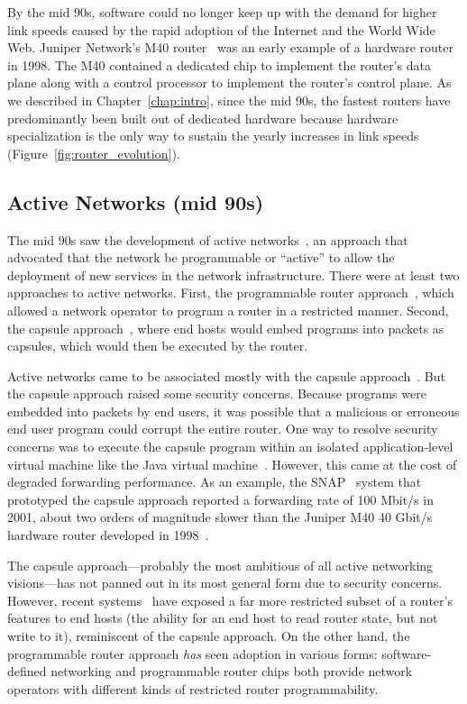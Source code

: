 By the mid 90s, software could no longer keep up with the demand for higher
link speeds caused by the rapid adoption of the Internet and the World Wide
Web. Juniper Network's M40 router~\cite{m40} was an early example of a hardware
router in 1998.  The M40 contained a dedicated chip to implement the router's
data plane along with a control processor to implement the router's control
plane. As we described in Chapter~\ref{chap:intro}, since the mid 90s, the
fastest routers have predominantly been built out of dedicated hardware because
hardware specialization is the only way to sustain the yearly increases in link
speeds (Figure~\ref{fig:router_evolution}).

\subsection{Active Networks (mid 90s)}
The mid 90s saw the development of active networks~\cite{ants, switchware}, an
approach that advocated that the network be programmable or ``active'' to allow
the deployment of new services in the network infrastructure. There were at
least two approaches to active networks. First, the programmable router
approach~\cite{switchware}, which allowed a network operator to program a
router in a restricted manner. Second, the capsule approach~\cite{ants,
wetherall_thesis, anet_retrospective}, where end hosts would embed programs
into packets as capsules, which would then be executed by the router.

Active networks came to be associated mostly with the capsule
approach~\cite{sdn_history}. But the capsule approach raised some security
concerns. Because programs were embedded into packets by end users, it was
possible that a malicious or erroneous end user program could corrupt the
entire router.  One way to resolve security concerns was to execute the capsule
program within an isolated application-level virtual machine like the Java
virtual machine~\cite{ants, wetherall_thesis, anet_retrospective}. However,
this came at the cost of degraded forwarding performance. As an example, the
SNAP~\cite{snap_active_packets} system that prototyped the capsule approach
reported a forwarding rate of 100 Mbit/s in 2001, about two orders of magnitude
slower than the Juniper M40 40 Gbit/s hardware router developed in
1998~\cite{m40}.

The capsule approach---probably the most ambitious of all active networking
visions---has not panned out in its most general form due to security concerns.
However, recent systems~\cite{int} have exposed a far more restricted subset of
a router's features to end hosts (\eg the ability for an end host to read
router state, but not write to it), reminiscent of the capsule approach.  On
the other hand, the programmable router approach {\em has} seen adoption in
various forms: software-defined networking and programmable router chips both
provide network operators with different kinds of restricted router
programmability.

